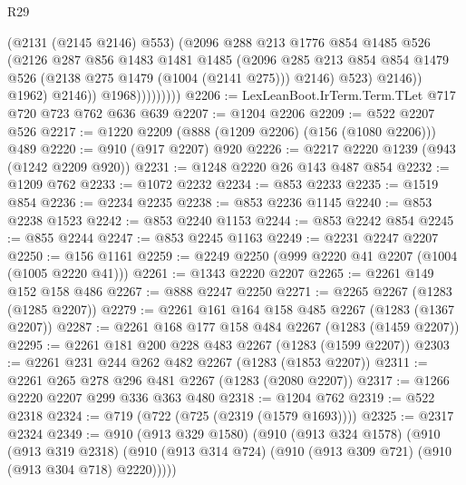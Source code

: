 \begin{lexlean}{R29}
\begin{coremodule}
                              (@2131 (@2145 @2146) @553)
                              (@2096
                                @288
                                @213
                                @1776
                                @854
                                @1485
                                @526
                                (@2126
                                  @287
                                  @856
                                  @1483
                                  @1481
                                  @1485
                                  (@2096
                                    @285
                                    @213
                                    @854
                                    @854
                                    @1479
                                    @526
                                    (@2138 @275 @1479 (@1004 (@2141 @275)))
                                    @2146)
                                  @523)
                                @2146))
                            @1962)
                          @2146))
                      @1968)))))))))
@2206 := LexLeanBoot.IrTerm.Term.TLet @717 @720 @723 @762 @636 @639
@2207 := @1204 @2206
@2209 := @522 @2207 @526
@2217 := @1220 @2209 (@888 (@1209 @2206) (@156 (@1080 @2206))) @489
@2220 := @910 (@917 @2207) @920
@2226 := @2217 @2220 @1239 (@943 (@1242 @2209 @920))
@2231 := @1248 @2220 @26 @143 @487 @854
@2232 := @1209 @762
@2233 := @1072 @2232
@2234 := @853 @2233
@2235 := @1519 @854
@2236 := @2234 @2235
@2238 := @853 @2236 @1145
@2240 := @853 @2238 @1523
@2242 := @853 @2240 @1153
@2244 := @853 @2242 @854
@2245 := @855 @2244
@2247 := @853 @2245 @1163
@2249 := @2231 @2247 @2207
@2250 := @156 @1161
@2259 := @2249 @2250 (@999 @2220 @41 @2207 (@1004 (@1005 @2220 @41)))
@2261 := @1343 @2220 @2207
@2265 := @2261 @149 @152 @158 @486
@2267 := @888 @2247 @2250
@2271 := @2265 @2267 (@1283 (@1285 @2207))
@2279 := @2261 @161 @164 @158 @485 @2267 (@1283 (@1367 @2207))
@2287 := @2261 @168 @177 @158 @484 @2267 (@1283 (@1459 @2207))
@2295 := @2261 @181 @200 @228 @483 @2267 (@1283 (@1599 @2207))
@2303 := @2261 @231 @244 @262 @482 @2267 (@1283 (@1853 @2207))
@2311 := @2261 @265 @278 @296 @481 @2267 (@1283 (@2080 @2207))
@2317 := @1266 @2220 @2207 @299 @336 @363 @480
@2318 := @1204 @762
@2319 := @522 @2318
@2324 := @719 (@722 (@725 (@2319 (@1579 @1693))))
@2325 := @2317 @2324
@2349 := @910
    (@913 @329 @1580)
    (@910
      (@913 @324 @1578)
      (@910
        (@913 @319 @2318)
        (@910 (@913 @314 @724) (@910 (@913 @309 @721) (@910 (@913 @304 @718) @2220)))))

\end{coremodule}
\end{lexlean}
